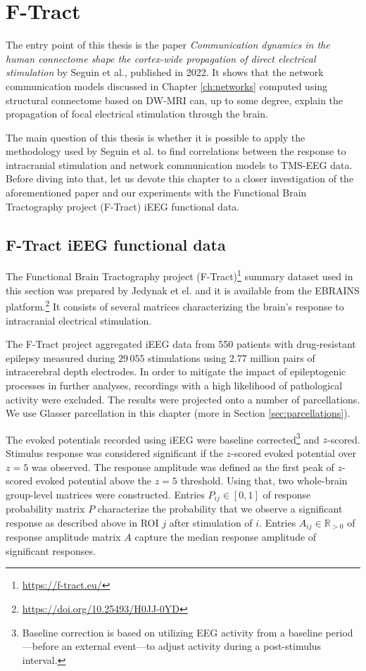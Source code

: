 \chapter{F-Tract}\label{ch:ftract}

The entry point of this thesis is the paper \textit{Communication dynamics in the human connectome shape the cortex-wide propagation of direct electrical stimulation} by Seguin et al., published in 2022. It shows that the network communication models discussed in Chapter \ref{ch:networks} computed using structural connectome based on DW-MRI can, up to some degree, explain the propagation of focal electrical stimulation through the brain. 

The main question of this thesis is whether it is possible to apply the methodology used by Seguin et al. to find correlations between the response to intracranial stimulation and network communication models to TMS-EEG data. Before diving into that, let us devote this chapter to a closer investigation of the aforementioned paper and our experiments with the Functional Brain Tractography project (F-Tract) iEEG functional data.  

\section{F-Tract iEEG functional data}\label{sec:f-tract_data_description}

The Functional Brain Tractography project (F-Tract)\footnote{\url{https://f-tract.eu/}} summary dataset used in this section was prepared by Jedynak et el. \cite{jedynak_f-tract_2023} and it is available from the EBRAINS platform.\footnote{\url{https://doi.org/10.25493/H0JJ-0YD}} It consists of several matrices characterizing the brain's response to intracranial electrical stimulation.

The F-Tract project aggregated iEEG data from 550 patients with drug-resistant epilepsy measured during $29\,055$ stimulations using 2.77 million pairs of intracerebral depth electrodes. In order to mitigate the impact of epileptogenic processes in further analyses, recordings with a high likelihood of pathological activity were excluded. The results were projected onto a number of parcellations. We use Glasser parcellation in this chapter (more in Section \ref{sec:parcellations}). \cite{jedynak_f-tract_2023,seguin_communication_2023} 

The evoked potentials recorded using iEEG were baseline corrected\footnote{Baseline correction is based on utilizing EEG activity from a baseline period—before an external event—to adjust activity during a post-stimulus interval.} and $z$-scored. Stimulus response was considered significant if the $z$-scored evoked potential over $z = 5$ was observed. The response amplitude was defined as the first peak of $z$-scored evoked potential above the $z = 5$ threshold. Using that, two whole-brain group-level matrices were constructed. Entries $P_{ij} \in [0,1]$ of response probability matrix $P$ characterize the probability that we observe a significant response as described above in ROI $j$ after stimulation of $i$. Entries $A_{ij} \in \mathbb{R}_{>0}$ of response amplitude matrix $A$ capture the median response amplitude of significant responses.

